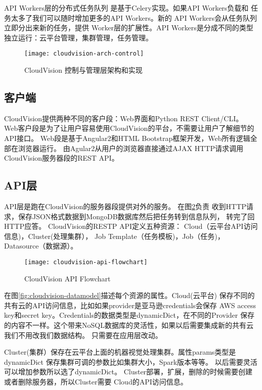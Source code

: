API Workers层的分布式任务队列
是基于Celery实现。\cite{celery}如果API Workers负载和
任务太多了我们可以随时增加更多的API Workers。新的
API Workers会从任务队列立即分出来新的任务，提供
Worker层的扩展性。API Workers是分成不同的类型
独立运行：云平台管理，集群管理，任务管理。

\begin{figure}[h]
  \centering
    \texttt{[image: cloudvision-arch-control]}
  \caption{CloudVision 控制与管理层架构和实现}
  \label{fig:cloudvision-arch-control}
\end{figure}

\subsection{客户端}
CloudVision提供两种不同的客户段：Web界面和Python REST Client/CLI。
Web客户段是为了让用户容易使用CloudVision的平台，不需要让用户了解细节的API接口。
Web段是基于Angular2和HTML Bootstrap框架开发，Web所有逻辑全部在浏览器运行。
由Agular2从用户的浏览器直接通过AJAX HTTP请求调用CloudVision服务器段的REST API。

\subsection{API层}
API层是跑在CloudVision的服务器段提供对外的服务。
在图\ref{fig:cloudvision-api-flowchart}负责
收到HTTP请求，保存JSON格式数据到MongoDB数据库然后把任务转到信息队列，
转完了回HTTP应答。 CloudVision的RESTP API定义五种资源：
Cloud（云平台API访问信息)，Cluster(处理集群），
Job Template（任务模板)，Job（任务)，Datasource（数据源）。
\begin{figure}[h]
  \centering
    \texttt{[image: cloudvision-api-flowchart]}
  \caption{CloudVision API Flowchart}
  \label{fig:cloudvision-api-flowchart}
\end{figure}


在图\ref{fig:cloudvision-datamodel}描述每个资源的属性。Cloud(云平台)
保存不同的共有云的API访问信息，比如如果provider是亚马逊credentials会保存
AWS access key和secret key。Credentials的数据类型是dynamicDict，在不同的Provider
保存的内容不一样。这个带来NoSQL数据库的灵活性，如果以后需要集成新的共有云我们不用改我们数据结构。
只需要在应用层改动。

Cluster(集群）保存在云平台上面的机器视觉处理集群。属性params类型是dynamicDict
保存集群可调的参数比如集群大小，Spark版本等等。
以后需要灵活可以增加参数所以选了dynamicDict。
Cluster部署，扩展，删除的时候需要创建或者删除服务器，所以Cluster需要
Cloud的API访问信息。

